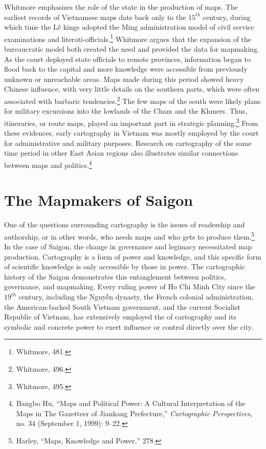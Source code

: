 Whitmore emphasizes the role of the state in the production of maps. The earliest records of Vietnamese maps date back only to the $15^{th}$ century, during which time the Lê kings adopted the Ming administration model of civil service examinations and literati-officials.\footnote{Whitmore, 481.} Whitmore argues that the expansion of the bureaucratic model both created the need and provided the data for mapmaking. As the court deployed state officials to remote provinces, information began to flood back to the capital and more knowledge were accessible from previously unknown or unreachable areas. Maps made during this period showed heavy Chinese influence, with very little details on the southern parts, which were often associated with barbaric tendencies.\footnote{Whitmore, 496.} The few maps of the south were likely plans for military excursions into the lowlands of the Cham and the Khmers. Thus, itineraries, or route maps, played an important part in strategic planning.\footnote{Whitmore, 495.} From these evidences, early cartography in Vietnam was mostly employed by the court for administrative and military purposes. Research on cartography of the same time period in other East Asian regions also illustrates similar connections between maps and politics.\footnote{Bangbo Hu, “Maps and Political Power: A Cultural Interpretation of the Maps in The Gazetteer of Jiankang Prefecture,” \textit{Cartographic Perspectives}, no. 34 (September 1, 1999): 9–22.}


\section{The Mapmakers of Saigon}\label{sec:mapmakers}
One of the questions surrounding cartography is the issues of readership and authorship, or in other words, who needs maps and who gets to produce them.\footnote{Harley, “Maps, Knowledge and Power,” 278.} In the case of Saigon, the change in governance and legimacy necessitated map production. Cartography is a form of power and knowledge, and this specific form of scientific knowledge is only accessible by those in power. The cartographic history of the Saigon demonstrates this entanglement between politics, governance, and mapmaking. Every ruling power of Ho Chi Minh City since the $19^{th}$ century, including the Nguyễn dynasty, the French colonial administration, the American-backed South Vietnam government, and the current Socialist Republic of Vietnam, has extensively employed the of cartography and its symbolic and concrete power to exert influence or control directly over the city.

